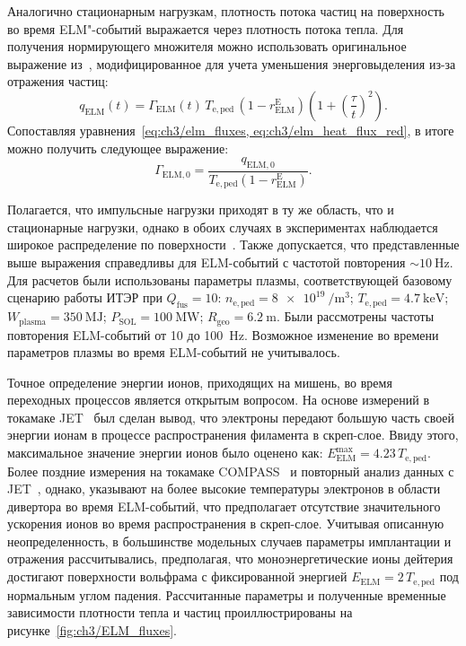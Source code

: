 Аналогично стационарным нагрузкам, плотность потока частиц на поверхность во время ELM"-событий выражается через плотность потока тепла. Для получения нормирующего множителя можно использовать оригинальное выражение из~\cite{Fundamenski2006, Moulton2013}, модифицированное для учета уменьшения энерговыделения из-за отражения частиц:
\begin{equation}
	\label{eq:ch3/elm_heat_flux_red}
	q_{\mathrm{ELM}}(t)=\Gamma_{\mathrm{ELM}}(t)\,T_{\mathrm{e,ped}}\,(1-r_{\mathrm{ELM}}^{\mathrm{E}})\left(1+\left(\frac{\tau}{t}\right)^2\right).
\end{equation}
Сопоставляя уравнения~\cref{eq:ch3/elm_fluxes, eq:ch3/elm_heat_flux_red}, в итоге можно получить следующее выражение:
\begin{equation}
	\Gamma_{\mathrm{ELM,0}}=\frac{q_{\mathrm{ELM,0}}}{T_{\mathrm{e,ped}}(1-r_{\mathrm{ELM}}^{\mathrm{E}})}.
\end{equation}

Полагается, что импульсные нагрузки приходят в ту же область, что и стационарные нагрузки, однако в обоих случаях в экспериментах наблюдается широкое распределение по поверхности~\cite{Pitts2019, Orrico2023, Eich2017}. Также допускается, что представленные выше выражения справедливы для ELM-событий с частотой повторения $\sim\SI{10}{\hertz}$. Для расчетов были использованы параметры плазмы, соответствующей базовому сценарию работы ИТЭР при $Q_\mathrm{fus}=10$: $n_{\mathrm{e,ped}}=\SI{8e19}{\per\meter\cubed}$; $T_{\mathrm{e,ped}}=\SI{4.7}{\kilo\electronvolt}$; $W_{\mathrm{plasma}}=\SI{350}{\mega\joule}$; $P_{\mathrm{SOL}}=\SI{100}{\mega\watt}$; $R_{\mathrm{geo}}=\SI{6.2}{\meter}$. Были рассмотрены частоты повторения ELM-событий от \num{10} до \SI{100}{\hertz}. Возможное изменение во времени параметров плазмы во время ELM-событий не учитывалось.

Точное определение энергии ионов, приходящих на мишень, во время переходных процессов является открытым вопросом. На основе измерений в токамаке JET~\cite{Guillemaut2015, Guillemaut2018} был сделан вывод, что электроны передают большую часть своей энергии ионам в процессе распространения филамента в скреп-слое. Ввиду этого, максимальное значение энергии ионов было оценено как: $E_{\mathrm{ELM}}^{\mathrm{max}}=4.23\,T_{\mathrm{e,ped}}$. Более поздние измерения на токамаке COMPASS~\cite{Adamek2020} и повторный анализ данных с JET~\cite{Horacek2023}, однако, указывают на более высокие температуры электронов в области дивертора во время ELM-событий, что предполагает отсутствие значительного ускорения ионов во время распространения в скреп-слое. Учитывая описанную неопределенность, в большинстве модельных случаев параметры имплантации и отражения рассчитывались, предполагая, что моноэнергетические ионы дейтерия достигают поверхности вольфрама с фиксированной энергией $E_{\mathrm{ELM}}=2\,T_{\mathrm{e,ped}}$ под нормальным углом падения. Рассчитанные параметры и полученные временные зависимости плотности тепла и частиц проиллюстрированы на рисунке~\ref{fig:ch3/ELM_fluxes}.

